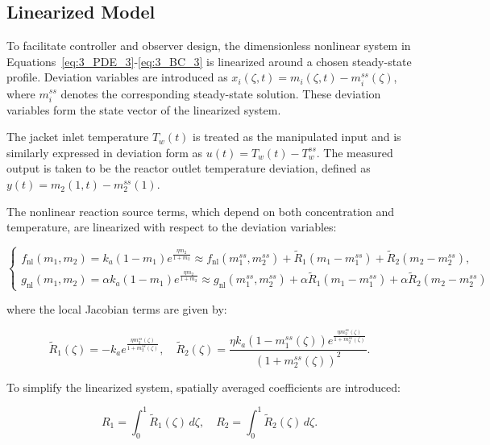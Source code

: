 \subsection{Linearized Model}

To facilitate controller and observer design, the dimensionless nonlinear system in Equations~\eqref{eq:3_PDE_3}-\eqref{eq:3_BC_3} is linearized around a chosen steady-state profile. Deviation variables are introduced as $ x_i(\zeta, t) = m_i(\zeta, t) - m_i^{ss}(\zeta) $, where $ m_i^{ss} $ denotes the corresponding steady-state solution. These deviation variables form the state vector of the linearized system. 

The jacket inlet temperature $ T_w(t) $ is treated as the manipulated input and is similarly expressed in deviation form as $ u(t) = T_w(t) - T_w^{ss} $. The measured output is taken to be the reactor outlet temperature deviation, defined as $ y(t) = m_2(1, t) - m_2^{ss}(1) $.

The nonlinear reaction source terms, which depend on both concentration and temperature, are linearized with respect to the deviation variables:

\begin{equation}
\begin{cases}
    f_{\text{nl}}(m_1, m_2) = k_a (1 - m_1) e^{\frac{\eta m_2}{1 + m_2}} \approx f_{\text{nl}}(m_{1}^{ss}, m_{2}^{ss}) + \tilde{R}_1 (m_1 - m_{1}^{ss}) + \tilde{R}_2 (m_2 - m_{2}^{ss}), \\[1.5ex]
    g_{\text{nl}}(m_1, m_2) = \alpha k_a (1 - m_1) e^{\frac{\eta m_2}{1 + m_2}} \approx g_{\text{nl}}(m_{1}^{ss}, m_{2}^{ss}) + \alpha \tilde{R}_1 (m_1 - m_{1}^{ss}) + \alpha \tilde{R}_2 (m_2 - m_{2}^{ss})
\end{cases}
\end{equation}


where the local Jacobian terms are given by:

\begin{equation}
    \tilde{R}_1(\zeta) = -k_a e^{\frac{\eta m_{2}^{ss}(\zeta)}{1 + m_{2}^{ss}(\zeta)}}, \quad
    \tilde{R}_2(\zeta) = \frac{\eta k_a (1 - m_{1}^{ss}(\zeta)) e^{\frac{\eta m_{2}^{ss}(\zeta)}{1 + m_{2}^{ss}(\zeta)}}}{(1 + m_{2}^{ss}(\zeta))^2}.
\end{equation}

To simplify the linearized system, spatially averaged coefficients are introduced:

\begin{equation}
    R_1 = \int_0^1 \tilde{R}_1(\zeta) \, d\zeta, \quad
    R_2 = \int_0^1 \tilde{R}_2(\zeta) \, d\zeta.
\end{equation}

